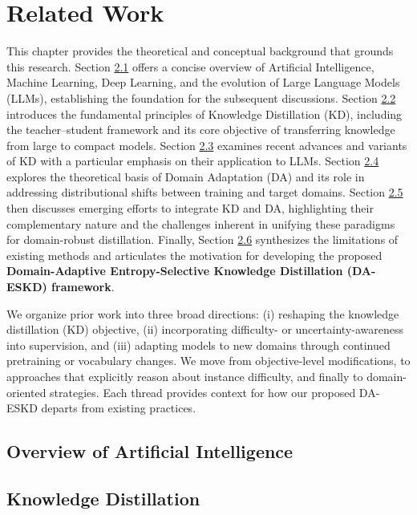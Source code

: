 \section{Related Work}

This chapter provides the theoretical and conceptual background that grounds this research. 
Section \hyperref[subsec: ai_overview]{2.1} offers a concise overview of Artificial Intelligence, Machine Learning, Deep Learning, and the evolution of Large Language Models (LLMs), establishing the foundation for the subsequent discussions. 
Section \hyperref[subsec: kd]{2.2} introduces the fundamental principles of Knowledge Distillation (KD), including the teacher–student framework and its core objective of transferring knowledge from large to compact models. 
Section \hyperref[subsec: advance_kd]{2.3} examines recent advances and variants of KD with a particular emphasis on their application to LLMs. 
Section \hyperref[subsec: da]{2.4} explores the theoretical basis of Domain Adaptation (DA) and its role in addressing distributional shifts between training and target domains. 
Section \hyperref[subsec: int]{2.5} then discusses emerging efforts to integrate KD and DA, highlighting their complementary nature and the challenges inherent in unifying these paradigms for domain-robust distillation. 
Finally, Section \hyperref[subsec: claim]{2.6} synthesizes the limitations of existing methods and articulates the motivation for developing the proposed \textbf{Domain-Adaptive Entropy-Selective Knowledge Distillation (DA-ESKD) framework}.

We organize prior work into three broad directions: (i) reshaping the knowledge distillation (KD) objective, (ii) incorporating difficulty- or uncertainty-awareness into supervision, and (iii) adapting models to new domains through continued pretraining or vocabulary changes. We move from objective-level modifications, to approaches that explicitly reason about instance difficulty, and finally to domain-oriented strategies. Each thread provides context for how our proposed DA-ESKD departs from existing practices.

\subsection{Overview of Artificial Intelligence}
\label{subsec: ai_overview}

\subsection{Knowledge Distillation}
\label{subsec: kd}

